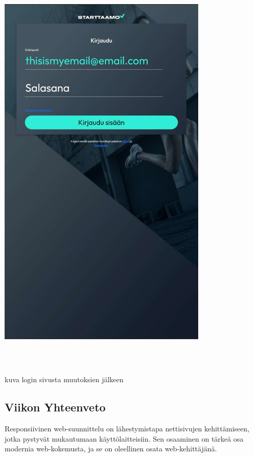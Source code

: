 \documentclass[11pt,a4paper,titlepage,oneside]{article}
\begin{document}
\includegraphics[width=10cm, height=20cm]{src/public/loginresponsive.jpg} \\
\medskip

kuva login sivusta muutoksien jälkeen
\medskip

\fi



\subsection*{Viikon Yhteenveto}


Responsiivinen web-suunnittelu on lähestymistapa nettisivujen kehittämiseen, jotka pystyvät mukautumaan käyttölaitteisiin. Sen osaaminen on tärkeä osa modernia web-kokemusta, ja se on oleellinen osata web-kehittäjänä.
\medskip
\end{document}
